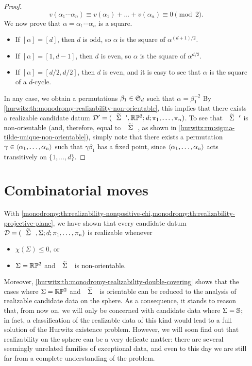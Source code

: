 \begin{proof}
\[
v(\alpha_1\cdots\alpha_n)\equiv v(\alpha_1)+\ldots+v(\alpha_n)\equiv 0\pmod{2}.
\]
We now prove that $\alpha=\alpha_1\cdots\alpha_n$ is a square.
\begin{itemize}
\item If $[\alpha]=[d]$, then $d$ is odd, so $\alpha$ is the square of $\alpha^{(d+1)/2}$.
\item If $[\alpha]=[1,d-1]$, then $d$ is even, so $\alpha$ is the square of $\alpha^{d/2}$.
\item If $[\alpha]=[d/2,d/2]$, then $d$ is even, and it is easy to see that $\alpha$ is the square of a $d$-cycle.
\end{itemize}
In any case, we obtain a permutations $\beta_1\in\symgroup[d]$ such that $\alpha=\beta_1^{-2}$
By \cref{hurwitz:th:monodromy-realizability-non-orientable}, this implies that there exists a realizable candidate datum $\DD'=\datum{\tSigma',\RP[2]}{d}{\pi_1,\ldots,\pi_n}$. To see that $\tSigma'$ is non-orientable (and, therefore, equal to $\tSigma$, as shown in \cref{hurwitz:rm:sigma-tilde-unique-non-orientable}), simply note that there exists a permutation $\gamma\in\left\langle\alpha_1,\ldots,\alpha_n\right\rangle$ such that $\gamma\beta_1$ has a fixed point, since $\left\langle\alpha_1,\ldots,\alpha_n\right\rangle$ acts transitively on $\{1,\ldots,d\}$.
\end{proof}

\section{Combinatorial moves}\label{monodromy:sc:combinatorial-moves}

With \cref{monodromy:th:realizability-nonpositive-chi,monodromy:th:realizability-projective-plane}, we have shown that every candidate datum $\DD=\datum{\tSigma,\Sigma}{d}{\pi_1,\ldots,\pi_n}$ is realizable whenever
\begin{itemize}
\item $\chi(\Sigma)\le 0$, or
\item $\Sigma=\RP[2]$ and $\tSigma$ is non-orientable.
\end{itemize}
Moreover, \cref{hurwitz:th:monodromy-realizability-double-covering} shows that the cases where $\Sigma=\RP[2]$ and $\tSigma$ is orientable can be reduced to the analysis of realizable candidate data on the sphere. As a consequence, it stands to reason that, from now on, we will only be concerned with candidate data where $\Sigma=\mathbb{S}{}$; in fact, a classification of the realizable data of this kind would lead to a full solution of the Hurwitz existence problem. However, we will soon find out that realizability on the sphere can be a very delicate matter: there are several seemingly unrelated families of exceptional data, and even to this day we are still far from a complete understanding of the problem.

